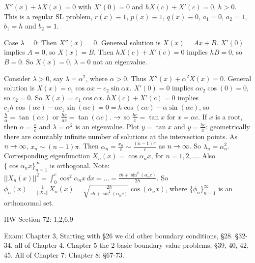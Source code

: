 \documentclass[]{article}
\begin{document}
\begin{example}
	$X''(x) + \lambda X(x) = 0$ with $X'(0) = 0$ and $hX(c) + X'(c) = 0$, $h>0$. This is a regular SL problem, $r(x) \equiv 1$, $p(x) \equiv 1$, $q(x) \equiv 0$, $a_1 = 0$, $a_2 = 1$, $b_1 = h$ and $b_2 = 1$.
	
	Case $\lambda = 0$: Then $X''(x) = 0$. Genereal solution is $X(x) = Ax+B$. $X'(0)$ implies $A= 0$, so $X(x) = B$. Then $hX(c) + X'(c) = 0$ implies $hB = 0$, so $B = 0$. So $X(x) = 0$, $\lambda = 0$ not an eigenvalue.
	
	Consider $\lambda>0$, say $\lambda = \alpha^2$, where $\alpha >0$. Thus $X''(x) + \alpha^2 X(x) = 0$. General solution is $X(x) = c_1 \cos{\alpha x} + c_2 \sin{\alpha x}$. $X'(0) = 0$ implies $\alpha c_2 \cos{(0)} = 0$, so $c_2 = 0$. So $X(x) = c_1 \cos{\alpha x}$. $hX(c) + X'(c) = 0$ implies $c_1 h \cos{(\alpha c)} - \alpha c_1 \sin{(\alpha c)} = 0 = h\cos{(\alpha c)} - \alpha \sin{(\alpha c)}$, so $\frac{h}{\alpha} = \tan{(\alpha c)}$ or $\frac{hc}{\alpha c} = \tan{(\alpha c)}$. $\rightarrow$ so $\frac{hc}x = \tan{x}$ for $x = \alpha c$. If $x$ is a root, then $\alpha = \frac{x}{c}$ and $\lambda = \alpha^2$ is an eigenvalue. Plot $y = \tan{x}$ and $y = \frac{hc}{x}$: geometrically there are countably infinite number of solutions at the intersection points. As $n\rightarrow \infty$, $x_n \sim (n-1)\pi$. Then $\alpha_n = \frac{x_n}{c} \sim \frac{(n-1)\pi}{c}$ as $n\rightarrow \infty$. So $\lambda_n = \alpha_n^2$. Corresponding eigenfunction $X_n(x) = \cos{\alpha_n x}$, for $n=1,2,\dots$. Also $\{\cos{\alpha_n x}\}_{n=1}^\infty$ is orthogonal. Note: $||X_n(x)||^2 = \int_0^c \cos^2{\alpha_n x}\, dx = \dots = \frac{ch + \sin^2{(\alpha_n c)}}{2h}$. So $\phi_n(x) = \frac{1}{||X_n||} X_n(x) = \sqrt{\frac{ 2h}{ch + \sin^2{(\alpha_n c)}}}\cos{(\alpha_n x)}$, where $\{\phi_n\}_{n=1}^\infty$ is an orthonormal set.
\end{example}

HW Section 72: 1,2,6,9

Exam: Chapter 3, Starting with \S26 we did other boundary conditions, \S28. \S32-34, all of Chapter 4. Chapter 5 the 2 basic boundary value problems, \S39, 40, 42, 45. All of Chapter 7: Chapter 8: \S67-73.
\end{document}
